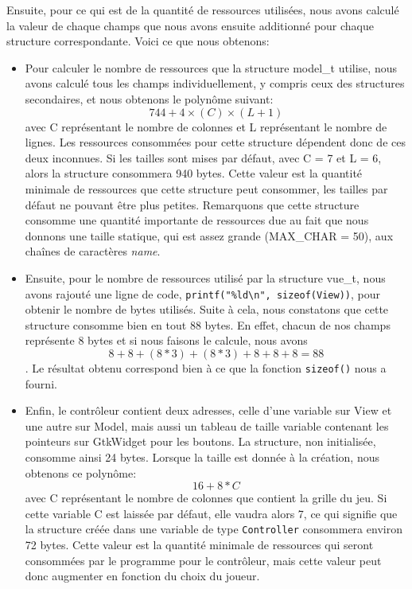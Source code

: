 \documentclass[a4paper, 11pt, oneside]{article}
\begin{document}
Ensuite, pour ce qui est de la quantité de ressources utilisées, nous avons calculé la valeur de chaque champs que nous avons ensuite additionné pour chaque structure correspondante. Voici ce que nous obtenons:
\begin{itemize}
    \item Pour calculer le nombre de ressources que la structure model\_t utilise, nous avons calculé tous les champs individuellement, y compris ceux des structures secondaires, et nous obtenons le polynôme suivant:
    $$744 + 4 \times (C) \times (L + 1)$$
    avec C représentant le nombre de colonnes et L représentant le nombre de lignes. Les ressources consommées pour cette structure dépendent donc de ces deux inconnues. Si les tailles sont mises par défaut, avec C = 7 et L = 6, alors la structure consommera 940 bytes. Cette valeur est la quantité minimale de ressources que cette structure peut consommer, les tailles par défaut ne pouvant être plus petites. Remarquons que cette structure consomme une quantité importante de ressources due au fait que nous donnons une taille statique, qui est assez grande (MAX\_CHAR = 50), aux chaînes de caractères \emph{name}.
    
    \item Ensuite, pour le nombre de ressources utilisé par la structure vue\_t, nous avons rajouté une ligne de code, \texttt{printf("\%ld\textbackslash n", sizeof(View))}, pour obtenir le nombre de bytes utilisés. Suite à cela, nous constatons que cette structure consomme bien en tout 88 bytes. En effet, chacun de nos champs représente 8 bytes et si nous faisons le calcule, nous avons $$ 8 + 8 + (8  * 3)+ (8 * 3) + 8 + 8 + 8 = 88$$.
    Le résultat obtenu correspond bien à ce que la fonction \texttt{sizeof()} nous a fourni.
    
    \item Enfin, le contrôleur contient deux adresses, celle d'une variable sur View et une autre sur Model, mais aussi un tableau de taille variable contenant les pointeurs sur GtkWidget pour les boutons. La structure, non initialisée, consomme ainsi 24 bytes. Lorsque la taille est donnée à la création, nous obtenons ce polynôme:
    $$16 + 8 * C$$
    avec C représentant le nombre de colonnes que contient la grille du jeu. Si cette variable C est laissée par défaut, elle vaudra alors 7, ce qui signifie que la structure créée dans une variable de type \texttt{Controller} consommera environ 72 bytes. Cette valeur est la quantité minimale de ressources qui seront consommées par le programme pour le contrôleur, mais cette valeur peut donc augmenter en fonction du choix du joueur.
\end{itemize}
\end{document}

